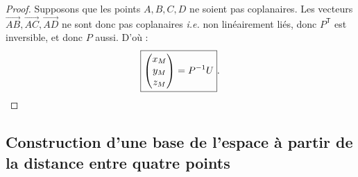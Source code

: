 \documentclass[french, a4paper, 12pt, parskip]{scrartcl}
\begin{document}
\begin{proof}
  Supposons que les points $A, B, C, D$ ne soient pas coplanaires. Les vecteurs
  $\overrightarrow{AB}, \overrightarrow{AC}, \overrightarrow{AD}$ ne sont donc
  pas coplanaires \textit{i.e.} non linéairement liés, donc $P^{\mathsf{T}}$
  est inversible, et donc $P$ aussi. D'où :
  \[
    \boxed{\begin{pmatrix}x_M\\y_M\\z_M\end{pmatrix} = P^{-1}U}.\qedhere
  \]
\end{proof}

\subsection{Construction d'une base de l'espace à partir de la distance entre quatre points}
\label{subsec:base-space}
\end{document}
